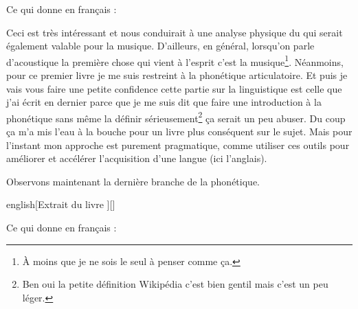 Ce qui donne en français :

\begin{quote}
\end{quote}

Ceci est très intéressant et nous conduirait à une analyse physique du
\son qui serait également valable pour la musique. D'ailleurs, en
général, lorsqu'on parle d'acoustique la première chose qui vient à
l'esprit c'est la musique\footnote{À moins que je ne sois le seul à
  penser comme ça.}. Néanmoins, pour ce premier livre je me suis
restreint à la phonétique articulatoire. Et puis je vais vous faire
une petite confidence cette partie sur la linguistique est celle que
j'ai écrit en dernier parce que je me suis dit que faire une
introduction à la phonétique sans même la définir
sérieusement\footnote{Ben oui la petite définition Wikipédia c'est
  bien gentil mais c'est un peu léger.} ça serait un peu abuser. Du
coup ça m'a mis l'eau à la bouche pour un livre plus conséquent sur le
sujet. Mais pour l'instant mon approche est purement pragmatique,
comme utiliser ces outils pour améliorer et accélérer l'acquisition
d'une langue (ici l'anglais).

Observons maintenant la dernière branche de la phonétique.

\begin{foreigndisplayquote}{english}[Extrait du livre \lodge][]
\end{foreigndisplayquote}

Ce qui donne en français :

\begin{quote}
\end{quote}

